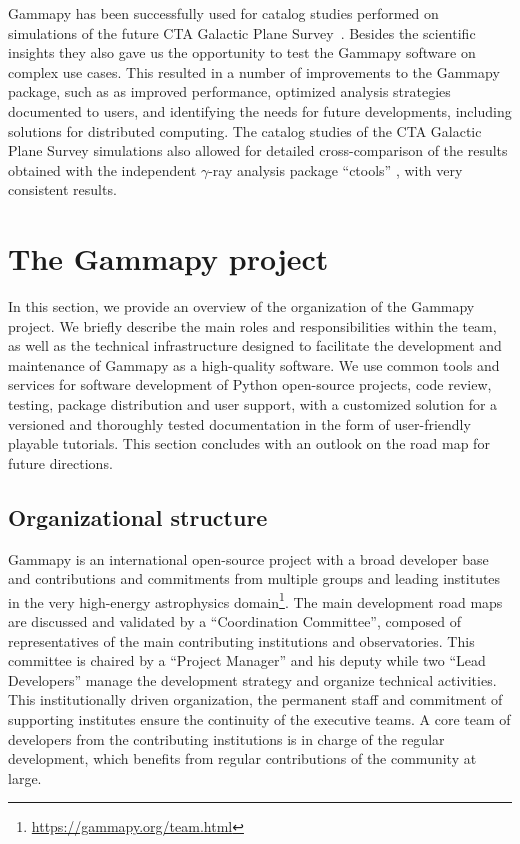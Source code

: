 \documentclass[longauth]{aa}
\newcommand{\gammapy}{Gammapy\xspace}
\newcommand{\cta}{CTA\xspace}
\newcommand{\gammaray}{$\gamma$-ray\xspace}
\begin{document}
\gammapy has been successfully used for catalog studies performed on simulations
of the future \cta Galactic Plane Survey~\citep{Remy2021}. Besides the scientific
insights they also gave us the opportunity to test the \gammapy software on complex
use cases. This resulted in a number of improvements to the \gammapy package, such as
as improved performance, optimized analysis strategies documented to users, and
identifying the needs for future developments, including solutions for distributed
computing. The catalog studies of the \cta Galactic Plane Survey simulations
also allowed for detailed cross-comparison of the results obtained with the independent
\gammaray analysis package \enquote{ctools} \citep{2016A&A...593A...1K}, with very consistent 
results.

\section{The \gammapy project} \label{sec:gammapy-project}

In this section, we provide an overview of the organization of the \gammapy
project. We briefly describe the main roles and responsibilities within the
team, as well as the technical infrastructure designed to facilitate the
development and maintenance of \gammapy as a high-quality software. We use
common tools and services for software development of Python open-source
projects, code review, testing, package distribution and user support, with a
customized solution for a versioned and thoroughly tested documentation in the form
of user-friendly playable tutorials. This section concludes with an outlook on
the road map for future directions.

\subsection{Organizational structure}
\label{ssec:organizational-structure}

\gammapy is an international open-source project with a broad
developer base and contributions and commitments from multiple groups and
leading institutes in the very high-energy astrophysics
domain\footnote{\url{https://gammapy.org/team.html}}. The main development
road maps are discussed and validated by a \enquote{Coordination Committee}, composed of
representatives of the main contributing institutions and observatories.
This committee is
chaired by a \enquote{Project Manager} and his deputy while two \enquote{Lead Developers} manage
the development strategy and organize technical activities. This
institutionally driven organization, the permanent staff and commitment of
supporting institutes ensure the continuity of the executive teams. A core team
of developers from the contributing institutions is in charge of the regular
development, which benefits from regular contributions of the community at
large.
\end{document}

